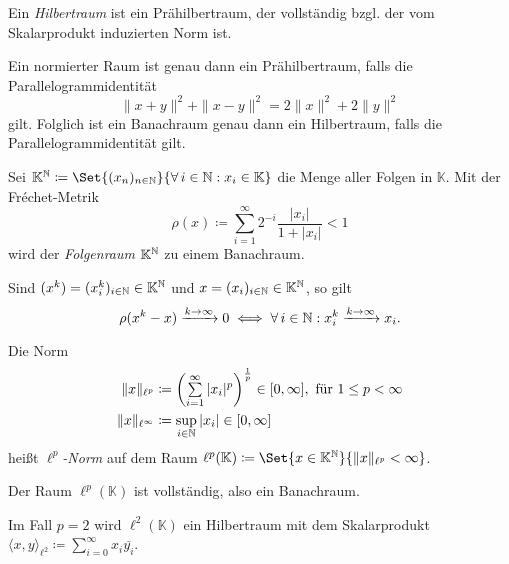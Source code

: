 \documentclass{cheat-sheet}
\newcommand{\K}{\mathbb{K}}
\newcommand{\convWith}[1]{\xrightarrow{#1 \to \infty}} %
\begin{document}
\begin{defn}
  Ein \emph{Hilbertraum} ist ein Prähilbertraum, der vollständig bzgl. der vom Skalarprodukt induzierten Norm ist.
\end{defn}

\begin{bem}
  Ein normierter Raum ist genau dann ein Prähilbertraum, falls die Parallelogrammidentität
  \[ \|x+y\|^2 + \|x-y\|^2 = 2 \|x\|^2 + 2 \|y\|^2 \]
  gilt. Folglich ist ein Banachraum genau dann ein Hilbertraum, falls die Parallelogrammidentität gilt.
\end{bem}

\begin{defn}
  Sei $\K^\N \coloneqq \Set{ (x_n)_{n \in \N} }{ \forall\,i \in \N : x_i \in \K }$ die Menge aller Folgen in $\K$. Mit der Fréchet-Metrik
    \[ \rho(x) \coloneqq \sum_{i = 1}^\infty 2^{-i} \frac{ |x_i| }{ 1 + |x_i| } < 1 \]
  wird der \emph{Folgenraum} $\K^\N$ zu einem Banachraum.
\end{defn}

\begin{satz}
  Sind $(x^k) = (x^k_i)_{i \in \N} \in \K^\N$ und $x = (x_i)_{i \in \N} \in \K^\N$, so gilt
  \[ \rho(x^k - x) \convWith{k} 0 \iff \forall\,i \in \N : x_i^k \convWith{k} x_i. \]
\end{satz}

\begin{defn}
  Die Norm
  \begin{align*}
    \| x \|_{\ell^p} &\coloneqq \left( \sum_{i=1}^\infty |x_i|^p \right)^{\frac{1}{p}} \in [0, \infty], \text{ für } 1 \leq p < \infty \\
    \| x \|_{\ell^\infty} &\coloneqq \sup_{i \in \N} |x_i| \in [0, \infty]
  \end{align*}
  heißt \emph{$\ell^p$-Norm} auf dem Raum $\ell^p(\K) \coloneqq \Set{ x \in \K^\N }{ \| x \|_{\ell^p} < \infty }$.
\end{defn}

\begin{satz}
  Der Raum $\ell^p(\K)$ ist vollständig, also ein Banachraum.
\end{satz}

\begin{bem}
  Im Fall $p = 2$ wird $\ell^2(\K)$ ein Hilbertraum mit dem Skalarprodukt $\langle x , y \rangle_{\ell^2} \coloneqq \sum_{i = 0}^\infty x_i \overline{y_i}$.
\end{bem}
\end{document}
